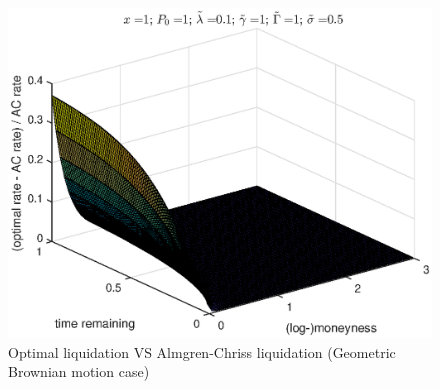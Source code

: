 \documentclass[11pt]{article}
\theoremstyle{definition}
\theoremstyle{remark}
\newcommand{\ts}{\textstyle}
\newcommand{\de}{\,\mathrm{d}}
\begin{document}
\begin{figure}
\includegraphics[]{GBM_AC.eps}
\caption{Optimal liquidation VS Almgren-Chriss liquidation (Geometric Brownian motion case)}
\label{fig:ABM_lin}
\end{figure}

\end{document}
